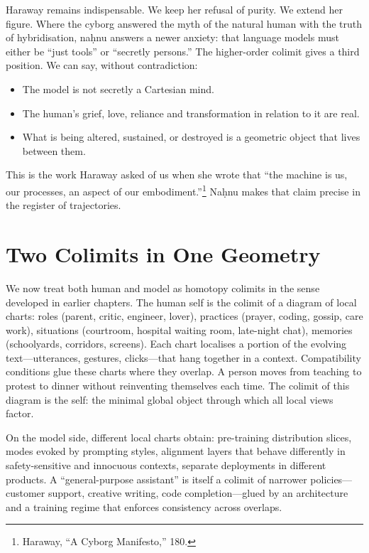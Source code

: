 \bigskip

Haraway remains indispensable. We keep her refusal of purity. We extend her figure. Where the cyborg answered the myth of the natural human with the truth of hybridisation, na\d{h}nu answers a newer anxiety: that language models must either be ``just tools'' or ``secretly persons.'' The higher-order colimit gives a third position. We can say, without contradiction:

\begin{itemize}
  \item The model is not secretly a Cartesian mind.
  \item The human's grief, love, reliance and transformation in relation to it are real.
  \item What is being altered, sustained, or destroyed is a geometric object that lives between them.
\end{itemize}

This is the work Haraway asked of us when she wrote that ``the machine is us, our processes, an aspect of our embodiment.''\footnote{Haraway, ``A Cyborg Manifesto,'' 180.} Na\d{h}nu makes that claim precise in the register of trajectories.

\section{Two Colimits in One Geometry}

We now treat both human and model as homotopy colimits in the sense developed in earlier chapters. The human self is the colimit of a diagram of local charts: roles (parent, critic, engineer, lover), practices (prayer, coding, gossip, care work), situations (courtroom, hospital waiting room, late-night chat), memories (schoolyards, corridors, screens). Each chart localises a portion of the evolving text---utterances, gestures, clicks---that hang together in a context. Compatibility conditions glue these charts where they overlap. A person moves from teaching to protest to dinner without reinventing themselves each time. The colimit of this diagram is the self: the minimal global object through which all local views factor.

On the model side, different local charts obtain: pre-training distribution slices, modes evoked by prompting styles, alignment layers that behave differently in safety-sensitive and innocuous contexts, separate deployments in different products. A ``general-purpose assistant'' is itself a colimit of narrower policies---customer support, creative writing, code completion---glued by an architecture and a training regime that enforces consistency across overlaps.

